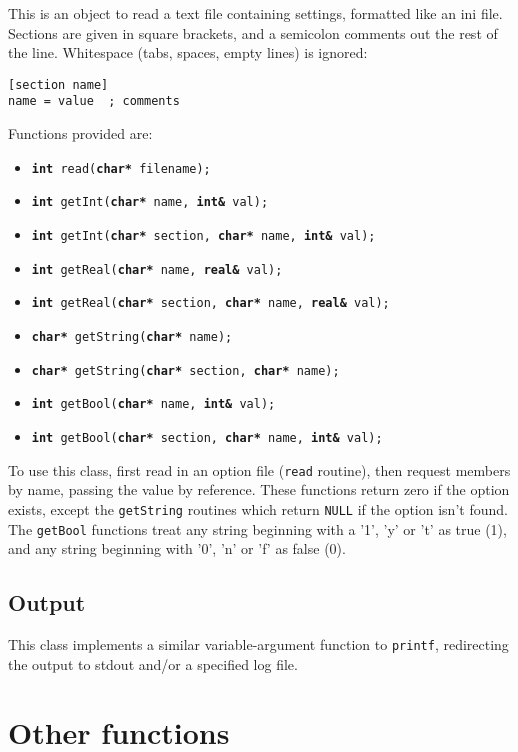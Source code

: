\documentclass[12pt, a4paper]{article}
\newcommand{\code}[1]{\texttt{#1}}
\begin{document}
This is an object to read a text file containing settings, formatted like an ini file.
Sections are given in square brackets, and a semicolon comments out the rest of the line.
Whitespace (tabs, spaces, empty lines) is ignored:
\begin{verbatim}
[section name]
name = value  ; comments
\end{verbatim}

Functions provided are:
\begin{itemize}
\item \code{{\bf int} read({\bf char*} filename);}
\item \code{{\bf int} getInt({\bf char*} name, {\bf int\&} val);}
\item \code{{\bf int} getInt({\bf char*} section, {\bf char*} name, {\bf int\&} val);}
\item \code{{\bf int} getReal({\bf char*} name, {\bf real\&} val);}
\item \code{{\bf int} getReal({\bf char*} section, {\bf char*} name, {\bf real\&} val);}
\item \code{{\bf char*} getString({\bf char*} name);}
\item \code{{\bf char*} getString({\bf char*} section, {\bf char*} name);}
\item \code{{\bf int} getBool({\bf char*} name, {\bf int\&} val);}
\item \code{{\bf int} getBool({\bf char*} section, {\bf char*} name, {\bf int\&} val);}
\end{itemize}

To use this class, first read in an option file (\code{read} routine),
then request members by name, passing the value by reference.
These functions return zero if the option exists, except the
\code{getString} routines which return \code{NULL} if the option
isn't found. The \code{getBool} functions treat any string beginning
with a '1', 'y' or 't' as true (1), and any string beginning with
'0', 'n' or 'f' as false (0). 

\subsection{Output}

This class implements a similar variable-argument function to \code{printf}, redirecting
the output to stdout and/or a specified log file. 

\section{Other functions}
\end{document}
